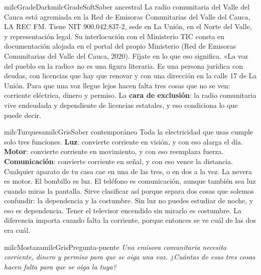 \documentclass[11pt,letterpaper]{article}
\begin{document}
\begin{softbox}{milcGradeDark}{milcGradeSoft}{Saber ancestral}
La radio comunitaria del Valle del Cauca está agremiada en la Red de Emisoras Comunitarias del Valle del Cauca, LA REC FM. Tiene NIT 900.042.837-2, sede en La Unión, en el Norte del Valle, y representación legal. Su interlocución con el Ministerio TIC consta en documentación alojada en el portal del propio Ministerio (Red de Emisoras Comunitarias del Valle del Cauca, 2020). Fíjate en lo que eso significa. «La voz del pueblo en la radio» no es una figura literaria. Es una persona jurídica con deudas, con licencias que hay que renovar y con una dirección en la calle 17 de La Unión. Para que una voz llegue lejos hacen falta tres cosas que no se ven: corriente eléctrica, dinero y permiso. La \textbf{cara de exclusión}: la radio comunitaria vive endeudada y dependiente de licencias estatales, y eso condiciona lo que puede decir.\par{}
\end{softbox}

\begin{softbox}{milcTurquesa}{milcGris}{Saber contemporáneo}
Toda la electricidad que usas cumple solo tres funciones. \textbf{Luz}: convierte corriente en visión, y con eso alarga el día. \textbf{Motor}: convierte corriente en movimiento, y con eso reemplaza fuerza. \textbf{Comunicación}: convierte corriente en señal, y con eso vence la distancia. Cualquier aparato de tu casa cae en una de las tres, o en dos a la vez. La nevera es motor. El bombillo es luz. El teléfono es comunicación, aunque también sea luz cuando miras la pantalla. Sirve clasificar así porque separa dos cosas que solemos confundir: la dependencia y la costumbre. Sin luz no puedes estudiar de noche, y eso es dependencia. Tener el televisor encendido sin mirarlo es costumbre. La diferencia importa cuando falta la corriente, porque entonces se ve cuál de las dos era cuál.
\end{softbox}

\begin{softbox}{milcMostaza}{milcGris}{Pregunta-puente}
\textit{Una emisora comunitaria necesita corriente, dinero y permiso para que se oiga una voz. ¿Cuántas de esas tres cosas hacen falta para que se oiga la tuya?}
\end{softbox}
\end{document}
